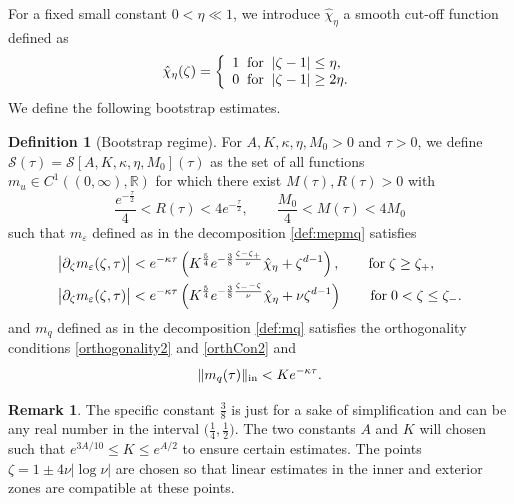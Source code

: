 \documentclass[11pt]{aims}
\theoremstyle{definition}
\newtheorem{definition}[theorem]{Definition}
\newtheorem{remark}[theorem]{Remark}
\newcommand{\ep}{\varepsilon}
\newcommand{\Sc}{\mathcal{S}}
\newcommand{\pa}{\partial}
\newcommand{\inn}{\textup{in}}
\newcommand{\out}{\textup{ex}}
\newcommand{\be}{\begin{equation}}
\newcommand{\ee}{\end{equation}}
\numberwithin{equation}{section}
\begin{document}
For a fixed small constant $0 < \eta \ll 1$, we introduce $ \hat \chi_{\eta}$ a smooth cut-off function defined as
\begin{equation}\label{def:hatchi_eta}
 \hat \chi_{\eta}(\zeta) = \left\{ \begin{array}{ll} 1 \;\; \textup{for}\;\; |\zeta - 1| \leq \eta,\\
0 \;\; \textup{for}\;\; |\zeta - 1| \geq 2 \eta.
\end{array}  \right.
\end{equation}
We define the following bootstrap estimates.

\begin{definition}[Bootstrap regime] \label{def:bootstrap} For $A,K ,\kappa,\eta ,M_0>0$ and $\tau > 0$, we define $\Sc(\tau)=\Sc [A,K,\kappa,\eta,M_0](\tau)$ as the set of all functions $m_u\in C^1 ((0, \infty),\mathbb R)$ for which there exist $M(\tau),R(\tau)>0$ with
\be
\frac{e^{-\frac \tau 2}}{4}< R(\tau)  < 4e^{-\frac \tau 2}, \qquad \frac{M_0}{4}< M(\tau)< 4 M_0 \label{est:MR}
\ee
such that $m_\varepsilon$ defined as in the decomposition \eqref{def:mepmq} satisfies
\begin{align}
\big| \pa_\zeta m_\ep(\zeta, \tau)\big| &< e^{-\kappa \tau} \left(K^{\frac{5}{4}} e^{-\frac 38 \frac{\zeta-\zeta_+}{\nu} }  \hat \chi_{\eta} + \zeta^{d-1} \right), \qquad \textup{for}\; \zeta \geq \zeta_+, \label{est:mepLinf_out} \\
\big| \pa_\zeta m_\ep(\zeta, \tau)\big| &< e^{-\kappa \tau} \left(K^\frac{5}{4} e^{-\frac{3}{8} \frac{ \zeta_--\zeta}{\nu} } \hat \chi_{\eta} +\nu \zeta^{d-1}  \right)  \qquad \textup{for}\; 0 < \zeta \leq \zeta_-. \label{est:mepLinf_out2}
\end{align}
and $m_q$ defined as in the decomposition \eqref{def:mq} satisfies the orthogonality conditions \eqref{orthogonality2} and \eqref{orthCon2} and
\be \label{est:mqL2ome}
\|m_q(\tau) \|_\inn < K e^{-\kappa \tau}.
\ee

\end{definition}



\begin{remark}
The specific constant $\frac{3}{8}$ is just for a sake of simplification and can be any real number in the interval  $\big(\frac 14,\frac 12\big)$. The two constants $A$ and $K$ will chosen such that $e^{3A/10}\leq K \leq e^{A/2}$ to ensure certain estimates. The points $\zeta= 1\pm 4\nu |\log \nu |$ are chosen so that linear estimates in the inner and exterior zones are compatible at these points.

\end{remark}
\end{document}
